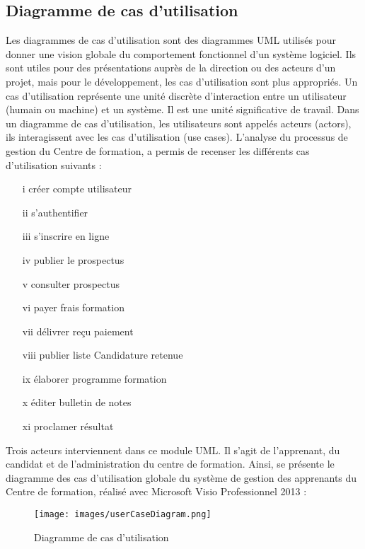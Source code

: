 \subsection{Diagramme de cas d'utilisation}
Les diagrammes de cas d'utilisation sont des diagrammes UML utilisés pour donner une vision globale du comportement fonctionnel d'un système logiciel. Ils sont utiles pour des présentations auprès de la direction ou des acteurs d'un projet, mais pour le développement, les cas d'utilisation sont plus appropriés. Un cas d'utilisation représente une unité discrète d'interaction entre un utilisateur (humain ou machine) et un système. Il est une unité significative de travail. Dans un diagramme de cas d'utilisation, les utilisateurs sont appelés acteurs (actors), ils interagissent avec les cas d'utilisation (use cases).
\newline
L'analyse du processus de gestion du Centre de formation, a permis de recenser les différents cas d'utilisation suivants :
\begin{itemize}
	\item[i]créer compte utilisateur
	\item[ii]s'authentifier
	\item[iii]s'inscrire en ligne
	\item[iv]publier le prospectus
	\item[v]consulter prospectus
	\item[vi]payer frais formation
	\item[vii] délivrer reçu paiement
	\item[viii]publier liste Candidature retenue
	\item[ix]élaborer programme formation
	\item[x]éditer bulletin de notes
	\item[xi]proclamer résultat
\end{itemize} 

Trois acteurs interviennent dans ce module UML. Il s'agit de l'apprenant, du candidat et de l'administration du centre de formation.
Ainsi, se présente le diagramme des cas d'utilisation globale du système de gestion des apprenants du Centre de formation, réalisé avec Microsoft Visio Professionnel 2013 :
\begin{figure}[H]
\begin{center}
	\texttt{[image: images/userCaseDiagram.png]}
	\caption{Diagramme de cas d'utilisation}
\end{center}
\end{figure}

